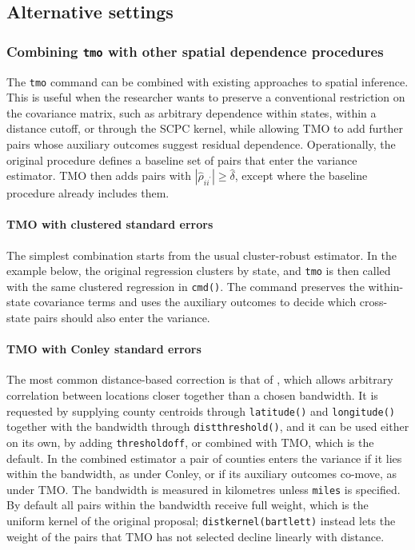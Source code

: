 \documentclass[varwidth,bib]{statapress}
\begin{document}
\begin{stlog}

\end{stlog}

\subsection{Alternative settings}
\subsubsection{Combining {\tt tmo} with other spatial dependence procedures}
The {\tt tmo} command can be combined with existing approaches to spatial
inference.  This is useful when the researcher wants to preserve a conventional
restriction on the covariance matrix, such as arbitrary dependence within
states, within a distance cutoff, or through the SCPC kernel, while allowing TMO
to add further pairs whose auxiliary outcomes suggest residual dependence.
Operationally, the original procedure defines a baseline set of pairs that enter
the variance estimator.  TMO then adds pairs with
$|\widehat\rho_{ii^\prime}|\geq \widehat\delta$, except where the baseline
procedure already includes them.

\paragraph{TMO with clustered standard errors}
The simplest combination starts from the usual cluster-robust estimator.  In the
example below, the original regression clusters by state, and {\tt tmo} is then
called with the same clustered regression in {\tt cmd()}.  The command preserves
the within-state covariance terms and uses the auxiliary outcomes to decide
which cross-state pairs should also enter the variance.

\begin{stlog}

\end{stlog}

\paragraph{TMO with Conley standard errors}
The most common distance-based correction is that of \citet{Conley1999}, which
allows arbitrary correlation between locations closer together than a chosen
bandwidth.  It is requested by supplying county centroids through
{\tt latitude()} and {\tt longitude()} together with the bandwidth through
{\tt distthreshold()}, and it can be used either on its own, by adding
{\tt thresholdoff}, or combined with TMO, which is the default.  In the combined
estimator a pair of counties enters the variance if it lies within the bandwidth,
as under Conley, or if its auxiliary outcomes co-move, as under TMO.  The
bandwidth is measured in kilometres unless {\tt miles} is specified.  By default
all pairs within the bandwidth receive full weight, which is the uniform kernel
of the original proposal; {\tt distkernel(bartlett)} instead lets the weight of
the pairs that TMO has not selected decline linearly with distance.
\end{document}

